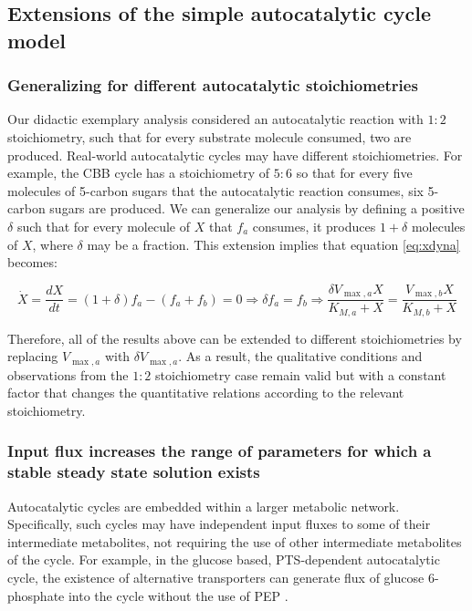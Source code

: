 \subsection{Extensions of the simple autocatalytic cycle model}
    \subsubsection{Generalizing for different autocatalytic stoichiometries}
    Our didactic exemplary analysis considered an autocatalytic reaction with $1:2$ stoichiometry, such that for every substrate molecule consumed, two are produced.
    Real-world autocatalytic cycles may have different stoichiometries.
    For example, the CBB cycle has a stoichiometry of $5:6$ so that for every five molecules of 5-carbon sugars that the autocatalytic reaction consumes, six 5-carbon sugars are produced.
    We can generalize our analysis by defining a positive $\delta$ such that for every molecule of $X$ that $f_a$ consumes, it produces $1+\delta$ molecules of $X$, where $\delta$ may be a fraction.
    This extension implies that equation \eqref{eq:xdyna} becomes:

    \begin{equation*}
      \dot X = \frac{dX}{dt} = (1+\delta)f_a - (f_a + f_b) = 0 \Rightarrow \delta f_a = f_b \Rightarrow \frac{\delta V_{\max,a}X}{K_{M,a}+X}=\frac{V_{\max,b}X}{K_{M,b}+X}
    \end{equation*}

    Therefore, all of the results above can be extended to different stoichiometries by replacing $V_{\max,a}$ with $\delta V_{\max,a}$.
    As a result, the qualitative conditions and observations from the $1:2$ stoichiometry case remain valid but with a constant factor that changes the quantitative relations according to the relevant stoichiometry.
\subsubsection{Input flux increases the range of parameters for which a stable steady state solution exists}
    Autocatalytic cycles are embedded within a larger metabolic network.
    Specifically, such cycles may have independent input fluxes to some of their intermediate metabolites, not requiring the use of other intermediate metabolites of the cycle.
    For example, in the glucose based, PTS-dependent autocatalytic cycle, the existence of alternative transporters can generate flux of glucose 6-phosphate into the cycle without the use of PEP \cite{Ferenci1996-nv}.

